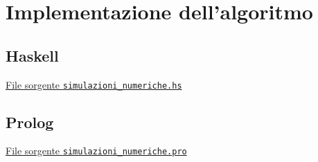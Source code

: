 \section{Implementazione dell'algoritmo}

\subsection{Haskell}
\underline{File sorgente \texttt{simulazioni\_numeriche.hs}} 


\newpage
\subsection{Prolog}
\underline{File sorgente \texttt{simulazioni\_numeriche.pro}}



